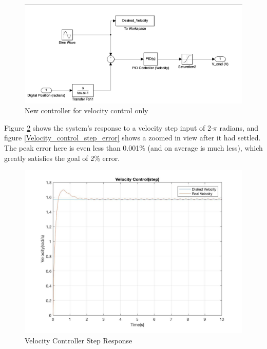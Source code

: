 \documentclass[letterpaper]{article}
\begin{document}
\begin{figure}[htb]
\begin{center}
\includegraphics[width = 13cm]{Matlab_simulink_question6.png}
\caption{New controller for velocity control only}
\label{Velocity_control_step}
\end{center}
\end{figure}

Figure \ref{Velocity_control_step} shows the system's response to a velocity step input of 2$\cdot\pi$ radians, and figure \ref{Velocity_control_step_error} shows a zoomed in view after it had settled. The peak error here is even less than 0.001\% (and on average is much less), which greatly satisfies the goal of 2\% error.\\

\begin{figure}[H]
\begin{center}
\includegraphics[width = 12cm]{Velocity_control(step).jpg}
\caption{Velocity Controller Step Response}
\label{Velocity_control_step}
\end{center}
\end{figure}
\end{document}
